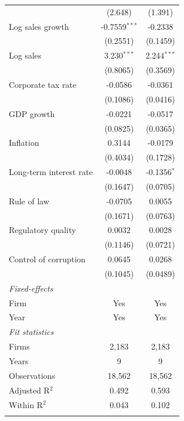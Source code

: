 \begin{table}[htbp]
\begin{tabular}{lcc}
                              & (2.648)          & (1.391) \\
      Log sales growth        & -0.7559$^{***}$  & -0.2338 \\
                              & (0.2551)         & (0.1459) \\
      Log sales               & 3.230$^{***}$    & 2.244$^{***}$ \\
                              & (0.8065)         & (0.3569) \\
      Corporate tax rate      & -0.0586          & -0.0361 \\
                              & (0.1086)         & (0.0416) \\
      GDP growth              & -0.0221          & -0.0517 \\
                              & (0.0825)         & (0.0365) \\
      Inflation               & 0.3144           & -0.0179 \\
                              & (0.4034)         & (0.1728) \\
      Long-term interest rate & -0.0048          & -0.1356$^{*}$ \\
                              & (0.1647)         & (0.0705) \\
      Rule of law             & -0.0705          & 0.0055 \\
                              & (0.1671)         & (0.0763) \\
      Regulatory quality      & 0.0032           & 0.0028 \\
                              & (0.1146)         & (0.0721) \\
      Control of corruption   & 0.0645           & 0.0268 \\
                              & (0.1045)         & (0.0489) \\
      \midrule
      \emph{Fixed-effects} \\
      Firm                    & Yes              & Yes \\
      Year                    & Yes              & Yes \\
      \midrule
      \emph{Fit statistics} \\
      Firms                   & 2,183            & 2,183 \\
      Years                   & 9                & 9 \\
      Observations            & 18,562           & 18,562 \\
      Adjusted R$^2$          & 0.492            & 0.593 \\
      Within R$^2$            & 0.043            & 0.102 \\
      \midrule \midrule & \tabularnewline
   \end{tabular}


\end{table}
